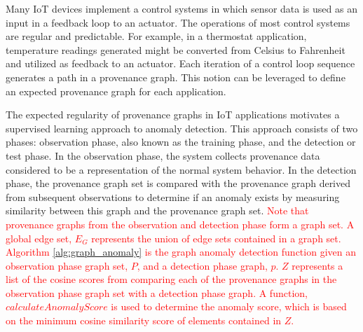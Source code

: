 \par Many IoT devices implement a control systems in which sensor data is used as an input in a feedback loop to an actuator. The operations of most control systems are regular and predictable. For example, in a thermostat application, temperature readings generated might be converted from Celsius to Fahrenheit and utilized as feedback to an actuator. Each iteration of a control loop sequence generates a path in a provenance graph. This notion can be leveraged to define an expected provenance graph for each application. 
\par The expected regularity of provenance graphs in IoT applications motivates a supervised learning approach to anomaly detection. This approach consists of two phases: observation phase, also known as the training phase, and the detection or test phase. In the observation phase, the system collects provenance data considered to be a representation of the normal system behavior. In the detection phase, the provenance graph set is compared with the provenance graph derived from subsequent observations to determine if an anomaly exists by measuring similarity between this graph and the provenance graph set. \textcolor{red}{Note that provenance graphs from the observation and detection phase form a graph set. A global edge set, $E_G$ represents the union of edge sets contained in a graph set. Algorithm \ref{alg:graph_anomaly} is the graph anomaly detection function given an observation phase graph set, $P$, and a detection phase graph, $p$. $Z$ represents a list of the cosine scores from comparing each of the provenance graphs in the observation phase graph set with a detection phase graph. A  function, $calculateAnomalyScore$ is used to determine the anomaly score, which is based on the minimum cosine similarity score of elements contained in $Z$.}

%
%







